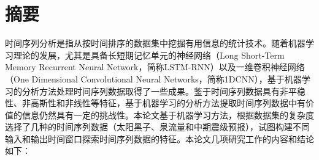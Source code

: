 \setlength{\headheight}{26pt}
\maketitle %
\MAKETITLE %
\makedeclaration %

\intobmk\chapter*{\texorpdfstring{摘\quad 要}{摘要}}
\setcounter{page}{1}
时间序列分析是指从按时间排序的数据集中挖掘有用信息的统计技术。随着机器学习理论的发展，尤其是具备长短期记忆单元的神经网络（Long Short-Term Memory Recurrent Neural Network，简称LSTM-RNN）以及一维卷积神经网络（One Dimensional Convolutional Neural Networks，简称1DCNN），基于机器学习的分析方法处理时间序列数据取得了一些成果。鉴于时间序列数据具有非平稳性、非高斯性和非线性等特征，基于机器学习的分析方法提取时间序列数据中有价值的信息仍然具有一定的挑战性。本论文基于机器学习方法，根据数据集的复杂度选择了几种的时间序列数据（太阳黑子、泉流量和中期震级预报），试图构建不同输入和输出时间窗口探索时间序列数据的特征。本论文几项研究工作的内容和结论如下：
